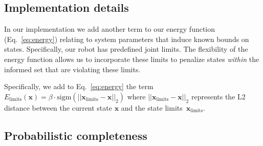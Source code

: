 \documentclass[letterpaper, 10 pt, conference]{ieeeconf}  %
\begin{document}
\subsection{Implementation details}
In our implementation we add another term to our energy function (Eq.~\ref{eq:energy}) relating to system parameters that induce known bounds on states.
Specifically, our robot has predefined joint limits. 
The flexibility of the energy function allows us to incorporate these limits  to penalize states \emph{within} the informed set that are violating these limits.

Specifically, we add to Eq.~\ref{eq:energy} the term 
$
E_{\text{limits}}\left(\mathbf{x}\right) = \beta\cdot \text{sigm} ( ||\mathbf{x}_{\text{limits}} - \mathbf{x}||_2 )
$
where $||\mathbf{x}_{\text{limits}} - \mathbf{x}||_2$ represents the L2 distance between the current state $\mathbf{x}$ and the state limits~$\mathbf{x}_{\text{limits}}$.
 

\subsection{Probabilistic completeness}
\end{document}
